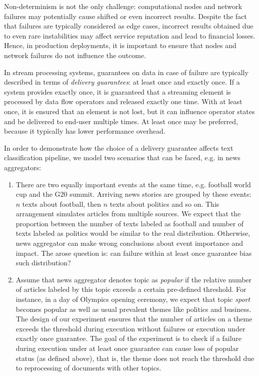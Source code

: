 Non-determinism is not the only challenge: computational nodes and network failures may potentially cause shifted or even incorrect results. Despite the fact that failures are typically considered as edge cases, incorrect results obtained due to even rare instabilities may affect service reputation and lead to financial losses. Hence, in production deployments, it is important to ensure that nodes and network failures do not influence the outcome.

In stream processing systems, guarantees on data in case of failure are typically described in terms of {\em delivery guarantees}: at least once and exactly once. If a system provides exactly once, it is guaranteed that a streaming element is processed by data flow operators and released exactly one time. With at least once, it is ensured that an element is not lost, but it can influence operator states and be delivered to end-user multiple times. At least once may be preferred, because it typically has lower performance overhead.

In order to demonstrate how the choice of a delivery guarantee affects text classification pipeline, we model two scenarios that can be faced, e.g. in news aggregators:
\begin{enumerate}
    \item There are two equally important events at the same time, e.g. football world cup and the G20 summit. Arriving news stories are grouped by these events: $n$ texts about football, then $n$ texts about politics and so on. This arrangement simulates articles from multiple sources. We expect that the proportion between the number of texts labeled as football and number of texts labeled as politics would be similar to the real distribution. Otherwise, news aggregator can make wrong conclusions about event importance and impact. The arose question is: can failure within at least once guarantee bias such distribution?
    \item Assume that news aggregator denotes topic as {\em popular} if the relative number of articles labeled by this topic exceeds a certain pre-defined threshold. For instance, in a day of Olympics opening ceremony, we expect that topic {\em sport} becomes popular as well as usual prevalent themes like politics and business. The design of our experiment ensures that the number of articles on a theme exceeds the threshold during execution without failures or execution under exactly once guarantee. The goal of the experiment is to check if a failure during execution under at least once guarantee can cause loss of popular status (as defined above), that is, the theme does not reach the threshold due to reprocessing of documents with other topics. 
\end{enumerate}

